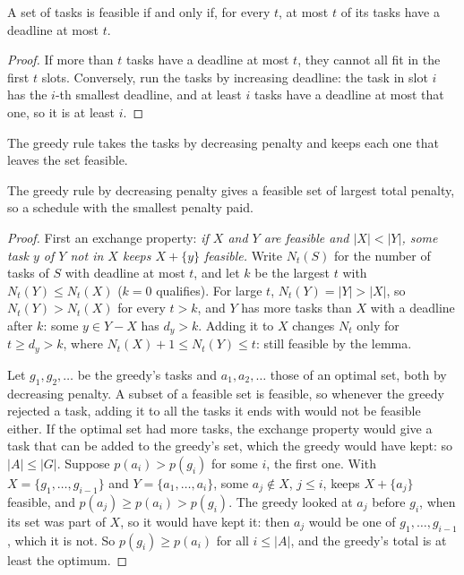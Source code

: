 \begin{lemma}[Feasibility]\label{lem:b1:greedy-proofs:feasible}
A set of tasks is feasible if and only if, for every $t$, at most $t$ of its tasks have a deadline at most $t$.
\end{lemma}

\begin{proof}
If more than $t$ tasks have a deadline at most $t$, they cannot all fit in the first $t$ slots. Conversely, run the
tasks by increasing deadline: the task in slot $i$ has the $i$-th smallest deadline, and at least $i$ tasks have a
deadline at most that one, so it is at least $i$.
\end{proof}

The greedy rule takes the tasks by decreasing penalty and keeps each one that leaves the set feasible.

\label{lst:b1:greedy-proofs:penalties}

\label{out:b1:greedy-proofs:penalties}

\begin{theorem}\label{thm:b1:greedy-proofs:penalties}
The greedy rule by decreasing penalty gives a feasible set of largest total penalty, so a schedule with the smallest
penalty paid.
\end{theorem}

\begin{proof}
First an exchange property: \emph{if $X$ and $Y$ are feasible and $|X| < |Y|$, some task $y$ of $Y$ not in $X$ keeps
$X + \{y\}$ feasible.} Write $N_t(S)$ for the number of tasks of $S$ with deadline at most $t$, and let $k$ be the
largest $t$ with $N_t(Y) \leq N_t(X)$ ($k = 0$ qualifies). For large $t$, $N_t(Y) = |Y| > |X|$, so $N_t(Y) > N_t(X)$
for every $t > k$, and $Y$ has more tasks than $X$ with a deadline after $k$: some $y \in Y - X$ has $d_y > k$. Adding
it to $X$ changes $N_t$ only for $t \geq d_y > k$, where $N_t(X) + 1 \leq N_t(Y) \leq t$: still feasible by the lemma.

Let $g_1, g_2, \dots$ be the greedy's tasks and $a_1, a_2, \dots$ those of an optimal set, both by decreasing penalty.
A subset of a feasible set is feasible, so whenever the greedy rejected a task, adding it to all the tasks it ends
with would not be feasible either. If the optimal set had more tasks, the exchange property would give a task that can be
added to the greedy's set, which the greedy would have kept: so $|A| \leq |G|$. Suppose $p(a_i) > p(g_i)$ for some $i$,
the first one. With $X = \{g_1, \dots, g_{i-1}\}$ and $Y = \{a_1, \dots, a_i\}$, some $a_j \notin X$, $j \leq i$, keeps
$X + \{a_j\}$ feasible, and $p(a_j) \geq p(a_i) > p(g_i)$. The greedy looked at $a_j$ before $g_i$, when its set was part
of $X$, so it would have kept it: then $a_j$ would be one of $g_1, \dots, g_{i-1}$, which it is not. So $p(g_i) \geq
p(a_i)$ for all $i \leq |A|$, and the greedy's total is at least the optimum.
\end{proof}

